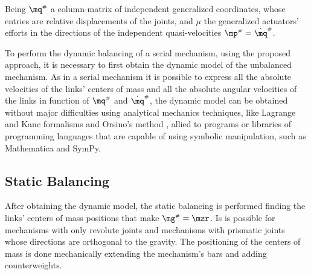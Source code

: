 \documentclass[a4paper,11pt,brazil,fleqn]{article}
\begin{document}
Being $\mq\ssh$ a column-matrix of independent generalized coordinates, whose entries are relative displacements of the joints, and $\mu$ the generalized actuators' efforts in the directions of the independent quasi-velocities $\mp\ssh = \dot{\mq}\ssh$.

To perform the dynamic balancing of a serial mechanism, using the proposed approach, it is necessary to first obtain the dynamic model of the unbalanced mechanism. As in a serial mechanism it is possible to express all the absolute velocities of the links' centers of mass and all the absolute angular velocities of the links in function of $\mq\ssh$ and $\dot{\mq}\ssh$, the dynamic model can be obtained without major difficulties using analytical mechanics techniques, like Lagrange and Kane formalisms and Orsino's method \cite{19orsino}, allied to programs or libraries of programming languages that are capable of using symbolic manipulation, such as Mathematica and SymPy.


\subsection{Static Balancing}\label{S02-2}

After obtaining the dynamic model, the static balancing is performed finding the links' centers of mass positions that make $\mg\ssh = \mzr$. Is is possible for mechanisms with only revolute joints and mechanisms with prismatic joints whose directions are orthogonal to the gravity. The positioning of the centers of mass is done mechanically extending the mechanism's bars and adding counterweights.
\end{document}
